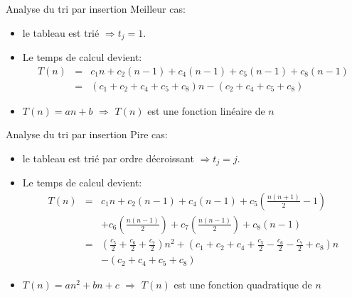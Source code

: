 \begin{frame}{Analyse du tri par insertion}
Meilleur cas:
\begin{itemize}
\item le tableau est trié $\Rightarrow t_j=1$.
\item Le temps de calcul devient:
\begin{eqnarray*}
T(n)&=&c_1 n+ c_2 (n-1)+c_4 (n-1)+c_5 (n-1)+c_8(n-1)\\
&=&(c_1+c_2+c_4+c_5+c_8)n- (c_2+c_4+c_5+c_8)
\end{eqnarray*}
\item $T(n)=an+b$ $\Rightarrow$ $T(n)$ est une fonction \alert{linéaire} de $n$\\

\end{itemize}

\end{frame}

\begin{frame}{Analyse du tri par insertion}
Pire cas:
\begin{itemize}
\item le tableau est trié par ordre décroissant $\Rightarrow t_j=j$.
\item Le temps de calcul devient:
{\footnotesize
\begin{eqnarray*}
T(n)&=&c_1 n+ c_2 (n-1)+c_4 (n-1)+c_5 \left( \frac{n(n+1)}{2}-1\right)\\
& & +c_6\left(\frac{n(n-1)}{2}\right)+c_7 \left(\frac{n(n-1)}{2}\right)+c_8 (n-1)\\
&=&(\frac{c_5}{2}+\frac{c_6}{2}+\frac{c_7}{2}) n^2 + (c_1+c_2+c_4+\frac{c_5}{2}-\frac{c_6}{2}-\frac{c_7}{2}+c_8)n\\
& & - (c_2+c_4+c_5+c_8)
\end{eqnarray*}
}
\item $T(n)=an^2+bn+c$ $\Rightarrow$ $T(n)$ est une fonction \alert{quadratique} de $n$
\end{itemize}

\end{frame}


